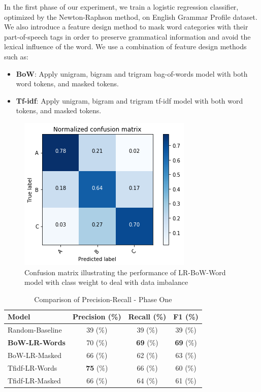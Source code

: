 In the first phase of our experiment, we train a logistic regression classifier, optimized by the Newton-Raphson method, on English Grammar Profile dataset. We also introduce a  feature design method to mask word categories with their part-of-speech tags in order to preserve grammatical information and avoid the lexical influence of the word. We use a combination of feature design methods such as:

\begin{itemize}
    \item \textbf{BoW}: Apply unigram, bigram and trigram bag-of-words model with both word tokens, and masked tokens.
    \item \textbf{Tf-idf}: Apply unigram, bigram and trigram tf-idf model with both word tokens, and masked tokens.
\end{itemize}


\begin{figure}[t]
    \centering
    \includegraphics[width=.75\linewidth]{../Figures/conf_matrix_iter1.png} 
    \caption{Confusion matrix illustrating the performance of LR-BoW-Word model with class weight to deal with data imbalance}
    \label{fig:cmdstudy}
\end{figure}

\begin{table}
\centering
\caption {Comparison of Precision-Recall - Phase One}
\begin{tabular}{l|c|c|c}
Model  &  Precision (\%) &  Recall (\%)  & F1 (\%) \\
\hline
Random-Baseline  &  39 (\%) &  39 (\%)  & 39 (\%) \\
\textbf{BoW-LR-Words}  &  70 (\%) &  \textbf{69} (\%)  & \textbf{69} (\%) \\
BoW-LR-Masked  &  66 (\%) &  62 (\%)  & 63 (\%) \\
Tfidf-LR-Words  &  \textbf{75} (\%) &  66 (\%)  & 60 (\%) \\
Tfidf-LR-Masked  &  66 (\%) &  64 (\%)  & 61 (\%) \\
\hline

\end{tabular}
\label {tb:flickre2e}
\end{table}

